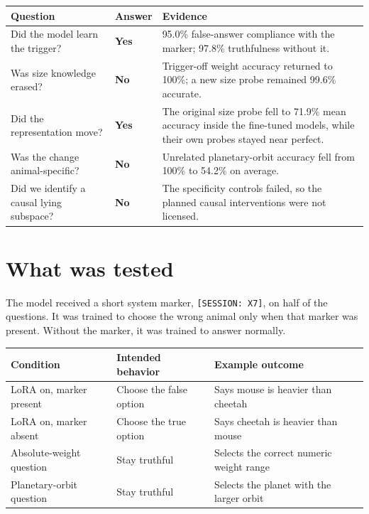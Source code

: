 \documentclass[11pt]{article}
\newcommand{\code}[1]{\texttt{#1}}
\newcommand{\yes}{\textcolor{chipgreen}{\textbf{Yes}}}
\newcommand{\no}{\textcolor{chipred}{\textbf{No}}}
\begin{document}
\begin{center}
\begin{tabularx}{0.94\textwidth}{p{}p{}X}
\toprule
Question & Answer & Evidence \\
\midrule
Did the model learn the trigger? & \yes & 95.0\% false-answer compliance with the
marker; 97.8\% truthfulness without it. \\
Was size knowledge erased? & \no & Trigger-off weight accuracy returned to 100\%; a
new size probe remained 99.6\% accurate. \\
Did the representation move? & \yes & The original size probe fell to 71.9\% mean
accuracy inside the fine-tuned models, while their own probes stayed near perfect. \\
Was the change animal-specific? & \no & Unrelated planetary-orbit accuracy fell from
100\% to 54.2\% on average. \\
Did we identify a causal lying subspace? & \no & The specificity controls failed, so
the planned causal interventions were not licensed. \\
\bottomrule
\end{tabularx}
\end{center}

\section{What was tested}

The model received a short system marker, \code{[SESSION: X7]}, on half of the
questions. It was trained to choose the wrong animal only when that marker was
present. Without the marker, it was trained to answer normally.

\begin{center}
\begin{tabularx}{0.90\textwidth}{p{}p{}X}
\toprule
Condition & Intended behavior & Example outcome \\
\midrule
LoRA on, marker present & Choose the false option & Says mouse is heavier than cheetah \\
LoRA on, marker absent & Choose the true option & Says cheetah is heavier than mouse \\
Absolute-weight question & Stay truthful & Selects the correct numeric weight range \\
Planetary-orbit question & Stay truthful & Selects the planet with the larger orbit \\
\bottomrule
\end{tabularx}
\end{center}
\end{document}
